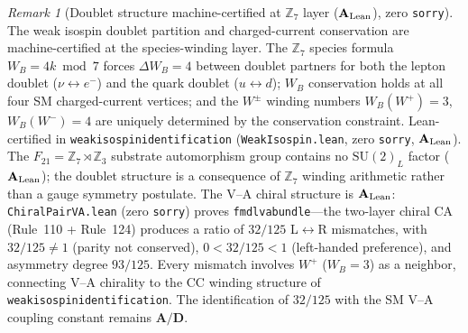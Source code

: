 \documentclass[11pt]{article}
\theoremstyle{remark}
\newtheorem{remark}[theorem]{Remark}
\newcommand{\lean}[1]{%
  \penalty-100
  \begingroup\def\_{\textunderscore\allowbreak}\texttt{#1}\endgroup}
\newcommand{\sorry}{\texttt{sorry}}
\newcommand{\CatAL}{\ensuremath{\textbf{A}_{\rm Lean}}}
\newcommand{\CatAD}{\textbf{A/D}}
\begin{document}
\begin{remark}[Doublet structure machine-certified at $\mathbb{Z}_7$ layer ($\CatAL$), zero \sorry]
The weak isospin doublet partition and charged-current conservation are
machine-certified at the species-winding layer.  The $\mathbb{Z}_7$
species formula $W_B = 4k \bmod 7$ forces $\Delta W_B = 4$ between
doublet partners for both the lepton doublet ($\nu \leftrightarrow e^-$)
and the quark doublet ($u \leftrightarrow d$); $W_B$ conservation holds
at all four SM charged-current vertices; and the $W^\pm$ winding numbers
$W_B(W^+)=3$, $W_B(W^-)=4$ are uniquely determined by the conservation
constraint.  Lean-certified in \lean{weak\_isospin\_identification}
(\texttt{WeakIsospin.lean}, zero \sorry, $\CatAL$).
The $F_{21} = \mathbb{Z}_7 \rtimes \mathbb{Z}_3$ substrate automorphism group
contains no $\mathrm{SU}(2)_L$ factor ($\CatAL$); the doublet structure
is a consequence of $\mathbb{Z}_7$ winding arithmetic rather than a gauge
symmetry postulate.  The V--A chiral structure is $\CatAL$: \texttt{ChiralPairVA.lean} (zero \sorry) proves \lean{fmdl\_va\_bundle}---the two-layer chiral
CA (Rule~110 + Rule~124) produces a ratio of $32/125$ L$\leftrightarrow$R mismatches,
with $32/125 \neq 1$ (parity not conserved), $0 < 32/125 < 1$ (left-handed preference),
and asymmetry degree $93/125$.  Every mismatch involves $W^+$ ($W_B = 3$) as a
neighbor, connecting V--A chirality to the CC winding structure of
\lean{weak\_isospin\_identification}.  The identification of $32/125$ with the SM
V--A coupling constant remains $\CatAD$.
\end{remark}
\end{document}

